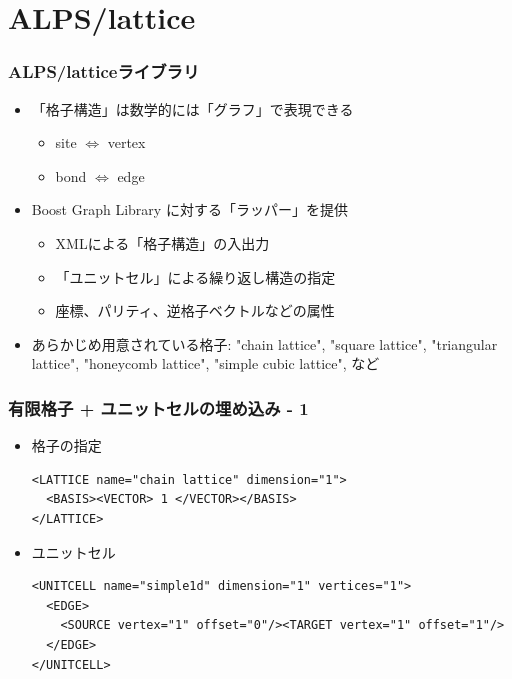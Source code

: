 \section{ALPS/lattice}
\begin{frame} [t,fragile]
  \frametitle{ALPS/latticeライブラリ}
  \begin{itemize}
    \setlength{\itemsep}{1em}
  \item 「格子構造」は数学的には「グラフ」で表現できる
    \begin{itemize}
    \item site $\Leftrightarrow$ vertex
    \item bond $\Leftrightarrow$ edge
    \end{itemize}
  \item Boost Graph Library に対する「ラッパー」を提供
    \begin{itemize}
    \item XMLによる「格子構造」の入出力
    \item 「ユニットセル」による繰り返し構造の指定
    \item 座標、パリティ、逆格子ベクトルなどの属性
    \end{itemize}
  \item あらかじめ用意されている格子: "chain lattice", "square lattice", "triangular lattice", "honeycomb lattice", "simple cubic lattice", など
  \end{itemize}
\end{frame}

\begin{frame}[t,fragile]
  \frametitle{有限格子 + ユニットセルの埋め込み - 1}
  \begin{itemize}
  \item 格子の指定
  \begin{lstlisting}
<LATTICE name="chain lattice" dimension="1">
  <BASIS><VECTOR> 1 </VECTOR></BASIS>
</LATTICE>
\end{lstlisting}
  \item ユニットセル
  \begin{lstlisting}
<UNITCELL name="simple1d" dimension="1" vertices="1">
  <EDGE>
    <SOURCE vertex="1" offset="0"/><TARGET vertex="1" offset="1"/>
  </EDGE>
</UNITCELL>
\end{lstlisting}
  \end{itemize}
\end{frame}

